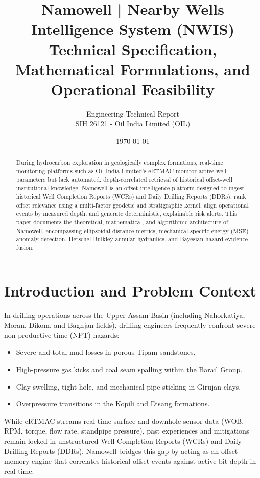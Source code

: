 \documentclass[11pt,a4paper]{article}
\title{\textbf{Namowell | Nearby Wells Intelligence System (NWIS)}\\\large Technical Specification, Mathematical Formulations, and Operational Feasibility}
\author{Engineering Technical Report\\SIH 26121 - Oil India Limited (OIL)}
\date{\today}
\begin{document}
\maketitle

\begin{abstract}
During hydrocarbon exploration in geologically complex formations, real-time monitoring platforms such as Oil India Limited's eRTMAC monitor active well parameters but lack automated, depth-correlated retrieval of historical offset-well institutional knowledge. Namowell is an offset intelligence platform designed to ingest historical Well Completion Reports (WCRs) and Daily Drilling Reports (DDRs), rank offset relevance using a multi-factor geodetic and stratigraphic kernel, align operational events by measured depth, and generate deterministic, explainable risk alerts. This paper documents the theoretical, mathematical, and algorithmic architecture of Namowell, encompassing ellipsoidal distance metrics, mechanical specific energy (MSE) anomaly detection, Herschel-Bulkley annular hydraulics, and Bayesian hazard evidence fusion.
\end{abstract}

\section{Introduction and Problem Context}
In drilling operations across the Upper Assam Basin (including Nahorkatiya, Moran, Dikom, and Baghjan fields), drilling engineers frequently confront severe non-productive time (NPT) hazards:
\begin{itemize}
    \item Severe and total mud losses in porous Tipam sandstones.
    \item High-pressure gas kicks and coal seam spalling within the Barail Group.
    \item Clay swelling, tight hole, and mechanical pipe sticking in Girujan clays.
    \item Overpressure transitions in the Kopili and Disang formations.
\end{itemize}

While eRTMAC streams real-time surface and downhole sensor data (WOB, RPM, torque, flow rate, standpipe pressure), past experiences and mitigations remain locked in unstructured Well Completion Reports (WCRs) and Daily Drilling Reports (DDRs). Namowell bridges this gap by acting as an offset memory engine that correlates historical offset events against active bit depth in real time.
\end{document}

